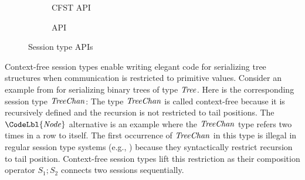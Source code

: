 \begin{figure}[tp]
  \TightCode
  \begin{subfigure}[t]{0.49\linewidth}
    \ApiOld
    \caption{CFST API}\label{lst:cfst-api}
  \end{subfigure}
  \begin{subfigure}[t]{0.49\linewidth}
    \ApiNew
    \caption{\thecalculus API}\label{lst:bcfst-api}
  \end{subfigure}
  \caption{Session type APIs}
  \label{fig:session-type-apis}
\end{figure}

Context-free session types enable writing elegant code for
serializing tree structures when communication is restricted to
primitive values.
Consider an example from \citet{DBLP:conf/icfp/ThiemannV16} for serializing
binary trees of type \ensuremath{\Conid{Tree}}.
%
\DefnTree
%
\noindent Here is the corresponding session type \ensuremath{\Conid{TreeChan}}:
%
\DefnTreeChan
%
\noindent The type \ensuremath{\Conid{TreeChan}} is called context-free because it is
recursively defined and the recursion is not restricted to tail
positions. The \ensuremath{\CodeLbl{\Conid{Node}}} alternative is an example where the
\ensuremath{\Conid{TreeChan}} type refers two times in a row to itself. The
first occurrence of \ensuremath{\Conid{TreeChan}} in this
type is illegal in regular session type systems (e.g.,
\citet{DBLP:journals/jfp/GayV10,DBLP:conf/esop/LindleyM15,Gay_Vasconcelos_2025}) because
they syntactically restrict recursion to tail position. Context-free
session types lift this restriction as their composition operator $S_1;S_2$ connects
two sessions sequentially.

